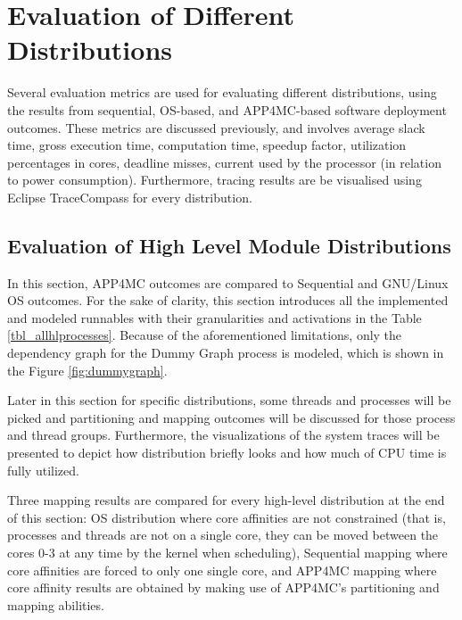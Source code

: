 \section{Evaluation of Different Distributions}
Several evaluation metrics are used for evaluating different distributions, using the results from sequential, OS-based, and APP4MC-based software deployment outcomes. These metrics are discussed previously, and involves average slack time, gross execution time, computation time, speedup factor, utilization percentages in cores, deadline misses, current used by the processor (in relation to power consumption).  Furthermore, tracing results are be visualised using Eclipse TraceCompass for every distribution.

\subsection{Evaluation of High Level Module Distributions}
In this section, APP4MC outcomes are compared to Sequential and GNU/Linux OS outcomes. For the sake of clarity, this section introduces all the implemented and modeled runnables with their granularities and activations in the Table \ref{tbl_allhlprocesses}. Because of the aforementioned limitations, only the dependency graph for the Dummy Graph process is modeled,  which is shown in the Figure \ref{fig:dummygraph}.

Later in this section for specific distributions, some threads and processes will be picked and partitioning and mapping outcomes will be discussed for those process and thread groups. Furthermore, the visualizations of the system traces will be presented to depict how distribution briefly looks and how much of CPU time is fully utilized.

Three mapping results are compared for every high-level distribution at the end of this section: OS distribution where core affinities are not constrained (that is, processes and threads are not on a single core, they can be moved between the cores 0-3 at any time by the kernel when scheduling), Sequential mapping where core affinities are forced to only one single core, and APP4MC mapping where core affinity results are obtained by making use of APP4MC's partitioning and mapping abilities. 

